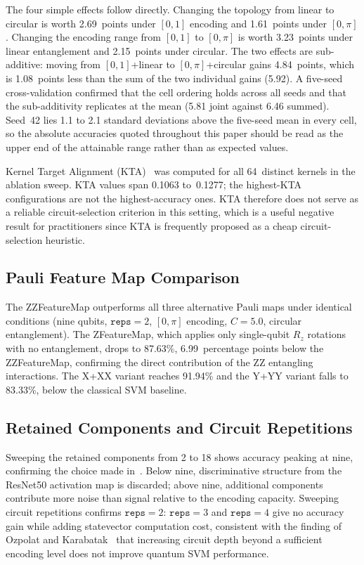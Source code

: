 \documentclass[10pt,conference]{IEEEtran}
\begin{document}
The four simple effects follow directly. Changing the topology from
linear to circular is worth 2.69~points under $[0,1]$ encoding and
1.61~points under $[0,\pi]$. Changing the encoding range from $[0,1]$
to $[0,\pi]$ is worth 3.23~points under linear entanglement and
2.15~points under circular. The two effects are sub-additive: moving
from $[0,1]$+linear to $[0,\pi]$+circular gains 4.84~points, which is
1.08~points less than the sum of the two individual gains (5.92). A
five-seed cross-validation confirmed that the cell ordering holds across
all seeds and that the sub-additivity replicates at the mean (5.81 joint
against 6.46 summed). Seed~42 lies 1.1 to 2.1 standard deviations above
the five-seed mean in every cell, so the absolute accuracies quoted
throughout this paper should be read as the upper end of the attainable
range rather than as expected values.

Kernel Target Alignment (KTA)~\cite{kta2001} was computed for all
64~distinct kernels in the ablation sweep. KTA values span 0.1063
to~0.1277; the highest-KTA configurations are not the
highest-accuracy ones. KTA therefore does not serve as a reliable
circuit-selection criterion in this setting, which is a useful negative
result for practitioners since KTA is frequently proposed as a cheap
circuit-selection heuristic.

\subsection{Pauli Feature Map Comparison}

The ZZFeatureMap outperforms all three alternative Pauli maps under
identical conditions (nine qubits, $\texttt{reps}\!=\!2$, $[0,\pi]$
encoding, $C\!=\!5.0$, circular entanglement). The ZFeatureMap, which
applies only single-qubit $R_z$ rotations with no entanglement, drops
to 87.63\%, 6.99~percentage points below the ZZFeatureMap, confirming
the direct contribution of the ZZ entangling interactions. The
$\mathrm{X}$+$\mathrm{XX}$ variant reaches 91.94\% and the
$\mathrm{Y}$+$\mathrm{YY}$ variant falls to 83.33\%, below the
classical SVM baseline.

\subsection{Retained Components and Circuit Repetitions}
\label{sec:svd-reps}

Sweeping the retained components from 2 to 18 shows accuracy peaking at
nine, confirming the choice made in~\cite{prabhu2023}. Below nine,
discriminative structure from the ResNet50 activation map is discarded;
above nine, additional components contribute more noise than signal
relative to the encoding capacity. Sweeping circuit repetitions
confirms $\texttt{reps}\!=\!2$: $\texttt{reps}\!=\!3$ and
$\texttt{reps}\!=\!4$ give no accuracy gain while adding statevector
computation cost, consistent with the finding of Ozpolat and
Karabatak~\cite{ozpolat2023} that increasing circuit depth beyond a
sufficient encoding level does not improve quantum SVM performance.
\end{document}

